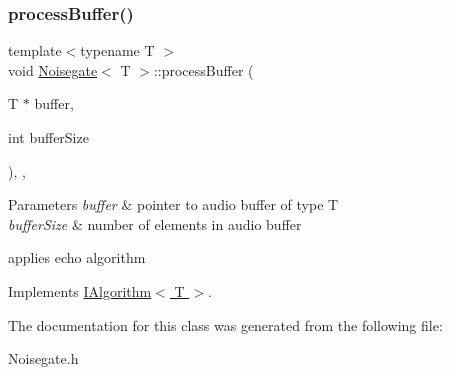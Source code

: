 \subsubsection{\texorpdfstring{process\+Buffer()}{processBuffer()}}
{\footnotesize\ttfamily template$<$typename T $>$ \\
void \hyperlink{classNoisegate}{Noisegate}$<$ T $>$\+::process\+Buffer (\begin{DoxyParamCaption}\item[{T $\ast$}]{buffer,  }\item[{int}]{buffer\+Size }\end{DoxyParamCaption})\hspace{0.3cm}{\ttfamily [inline]}, {\ttfamily [override]}, {\ttfamily [virtual]}}


\begin{DoxyParams}{Parameters}
{\em buffer} & pointer to audio buffer of type T \\
\hline
{\em buffer\+Size} & number of elements in audio buffer\\
\hline
\end{DoxyParams}
applies echo algorithm 

Implements \hyperlink{classIAlgorithm}{I\+Algorithm$<$ T $>$}.



The documentation for this class was generated from the following file\+:\begin{DoxyCompactItemize}
\item 
Noisegate.\+h\end{DoxyCompactItemize}
